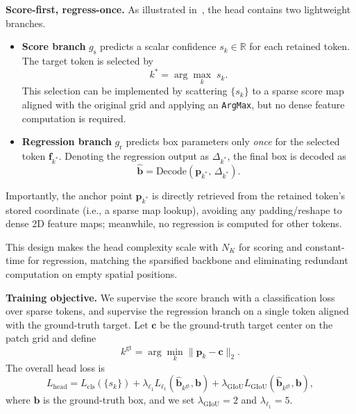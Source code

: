 \textbf{Score-first, regress-once.} As illustrated in~, the head contains two lightweight branches.
\begin{itemize}
  \item \textbf{Score branch} $g_{\text{s}}$ predicts a scalar confidence $s_k\in\mathbb{R}$ for each retained token.
      The target token is selected by
      \begin{equation}
        k^* = \arg\max_k\; s_k.
      \end{equation}
      This selection can be implemented by scattering $\{s_k\}$ to a sparse score map aligned with the original grid and applying an \texttt{ArgMax}, but no dense feature computation is required.

  \item \textbf{Regression branch} $g_{\text{r}}$ predicts box parameters only \emph{once} for the selected token $\mathbf{f}_{k^*}$.
      Denoting the regression output as $\Delta_{k^*}$, the final box is decoded as
      \begin{equation}
        \hat{\mathbf{b}} = \mathrm{Decode}(\mathbf{p}_{k^*},\, \Delta_{k^*}).
      \end{equation}
\end{itemize}

Importantly, the anchor point $\mathbf{p}_{k^*}$ is directly retrieved from the retained token's stored coordinate (i.e., a sparse map lookup), avoiding any padding/reshape to dense 2D feature maps; meanwhile, no regression is computed for other tokens.

This design makes the head complexity scale with $N_K$ for scoring and constant-time for regression, matching the sparsified backbone and eliminating redundant computation on empty spatial positions.

\textbf{Training objective.} We supervise the score branch with a classification loss over sparse tokens, and supervise the regression branch on a single token aligned with the ground-truth target.
Let $\mathbf{c}$ be the ground-truth target center on the patch grid and define
\begin{equation}
  k^{\text{gt}} = \arg\min_k \lVert \mathbf{p}_k - \mathbf{c} \rVert_2.
\end{equation}
The overall head loss is
\begin{equation}
  L_{\text{head}} = L_{\text{cls}}(\{s_k\}) + \lambda_{\ell_1} L_{\ell_1}(\hat{\mathbf{b}}_{k^{\text{gt}}}, \mathbf{b}) + \lambda_{\text{GIoU}} L_{\text{GIoU}}(\hat{\mathbf{b}}_{k^{\text{gt}}}, \mathbf{b}),
\end{equation}
where $\mathbf{b}$ is the ground-truth box, and we set $\lambda_{\text{GIoU}} = 2$ and $\lambda_{\ell_1}=5$.
